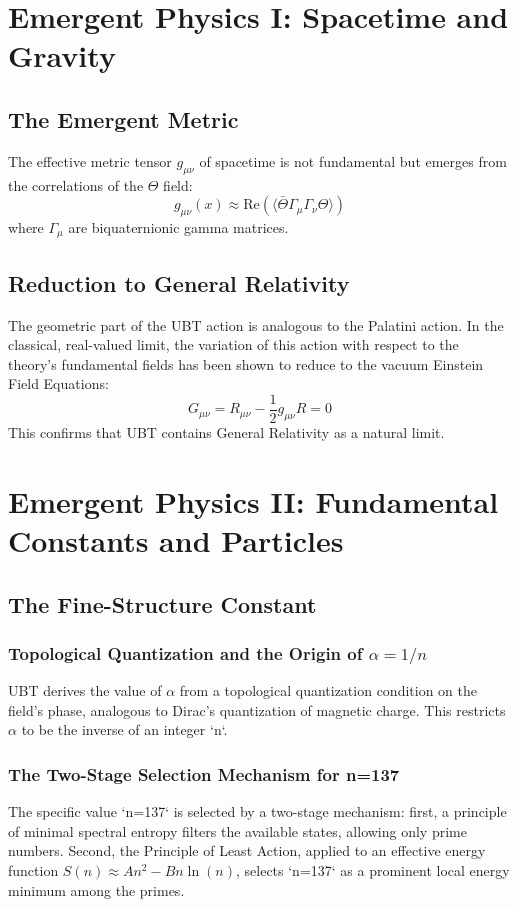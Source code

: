 \documentclass[12pt, a4paper]{article}
\begin{document}
\section{Emergent Physics I: Spacetime and Gravity}

\subsection{The Emergent Metric}
The effective metric tensor \( g_{\mu\nu} \) of spacetime is not fundamental but emerges from the correlations of the \( \Theta \) field:
\begin{equation}
g_{\mu\nu}(x) \approx \text{Re}(\langle \bar{\Theta} \Gamma_\mu \Gamma_\nu \Theta \rangle)
\end{equation}
where \( \Gamma_\mu \) are biquaternionic gamma matrices.

\subsection{Reduction to General Relativity}
The geometric part of the UBT action is analogous to the Palatini action. In the classical, real-valued limit, the variation of this action with respect to the theory's fundamental fields has been shown to reduce to the vacuum Einstein Field Equations:
\begin{equation}
G_{\mu\nu} = R_{\mu\nu} - \frac{1}{2} g_{\mu\nu} R = 0
\end{equation}
This confirms that UBT contains General Relativity as a natural limit.

\section{Emergent Physics II: Fundamental Constants and Particles}
\subsection{The Fine-Structure Constant}
\subsubsection{Topological Quantization and the Origin of \( \alpha = 1/n \)}
UBT derives the value of \( \alpha \) from a topological quantization condition on the field's phase, analogous to Dirac's quantization of magnetic charge. This restricts \( \alpha \) to be the inverse of an integer `n`.

\subsubsection{The Two-Stage Selection Mechanism for n=137}
The specific value `n=137` is selected by a two-stage mechanism: first, a principle of minimal spectral entropy filters the available states, allowing only prime numbers. Second, the Principle of Least Action, applied to an effective energy function \( S(n) \approx A n^2 - B n \ln(n) \), selects `n=137` as a prominent local energy minimum among the primes.
\end{document}
